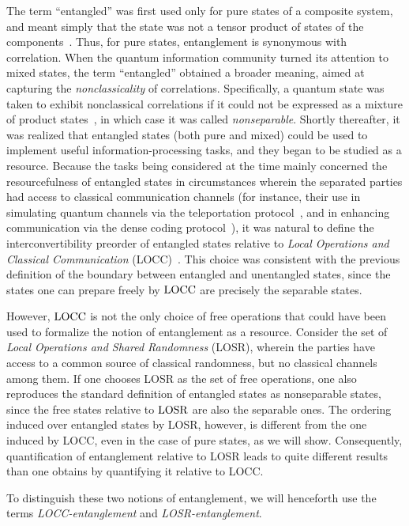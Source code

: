 \documentclass[prx,11pt,letterpaper,twocolumn,accepted=2023-11-27]{quantumarticle}
\newcommand{\LOSR}[0]{\ifmmode\textup{\upshape LOSR}\else{\textup{\upshape LOSR}}\fi}
\newcommand{\LOCC}[0]{\ifmmode\textup{\upshape LOCC}\else{\textup{\upshape LOCC}}\fi}
\theoremstyle{plain}
\theoremstyle{definition}
\begin{document}
The term ``entangled'' was first used only for pure states of a composite system, and meant simply that the state was not a tensor product of states of the components~\cite{Schrodinger1935}.  Thus, for pure states, entanglement is synonymous with correlation.  When the quantum information community turned its attention to mixed states, the term ``entangled'' obtained a broader meaning, aimed at capturing the {\em nonclassicality} of correlations.  Specifically, a quantum state was taken to exhibit nonclassical correlations if it could not be expressed as a mixture of product states~\cite{werner1989quantum}, in which case it was called {\em nonseparable}. Shortly thereafter, it was realized that entangled states (both pure and mixed) could be used to implement useful information-processing tasks, and they began to be studied as a resource. Because the tasks being considered at the time mainly concerned the resourcefulness of entangled states in circumstances wherein the separated parties had access to classical communication channels (for instance, their use in simulating quantum channels via the teleportation protocol~\cite{teleportation}, and in enhancing communication via the dense coding protocol~\cite{densecoding}),
it was natural to define the interconvertibility preorder of entangled states relative to {\em Local Operations and Classical Communication} (LOCC)~\cite{BBPS96}.
This choice was consistent with the previous definition of the boundary between entangled and unentangled states, since the states one can prepare freely by $\LOCC$ are precisely the separable states.

However, $\LOCC$ is not the only choice of free operations that could have been used to formalize the notion of entanglement as a resource.  Consider the set of {\em Local Operations and Shared Randomness} (LOSR), wherein the parties have access to a common source of classical randomness, but no classical channels among them.  If one chooses LOSR as the set of free operations, one also reproduces the standard definition of entangled states as nonseparable states, since the free states relative to $\LOSR$ are also the separable ones.
 The ordering induced over entangled states by LOSR, however, is different from the one induced by LOCC, even in the case of pure states, as we will show. Consequently, quantification of entanglement relative to LOSR leads to quite different results than one obtains by quantifying it relative to LOCC.

To distinguish these two notions of entanglement, we will henceforth use the terms {\em LOCC-entanglement} and {\em LOSR-entanglement}.
\end{document}
